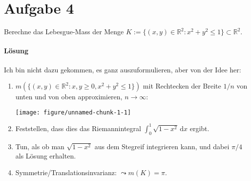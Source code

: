 \documentclass[10pt]{article}\usepackage[]{graphicx}\usepackage[]{color}
\newenvironment{knitrout}{}{} %
\newcommand{\R}{\mathbb{R}}
\newcommand{\df}{\,\textrm{d}}
\begin{document}
\section*{Aufgabe 4}
Berechne das Lebesgue-Mass
der Menge
$K := \{(x,y) \in \R^2 : x^2 + y^2 \leq 1\} \subset \R^2$.

\paragraph{Lösung}
Ich bin nicht dazu gekommen, es ganz auszuformulieren,
aber von der Idee her:
\begin{enumerate}[1.]
  \item $m(\{(x,y) \in \R^2 : x, y \geq 0, x^2 + y^2 \leq 1\})$ mit Rechtecken
        der Breite $1/n$ von unten und von oben approximieren, $n \to \infty$:
        
\begin{knitrout}
\color{fgcolor}
\texttt{[image: figure/unnamed-chunk-1-1]} 
\end{knitrout}

  \item Feststellen, dass dies das Riemannintegral $\int_0^1 \sqrt{1 - x^2} \df x$ ergibt.
  \item Tun, als ob man $\sqrt{1 - x^2}$ aus dem Stegreif integrieren kann, und dabei $\pi/4$ als Lösung erhalten.
  \item Symmetrie/Translationsinvarianz: $\leadsto m(K) = \pi$.
\end{enumerate}
\end{document}
